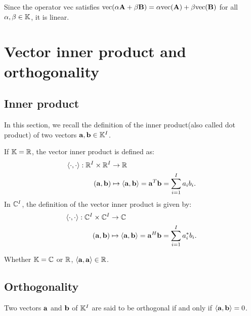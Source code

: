 \begin{remark}
    Since the operator $\text{vec}$ satisfies $\text{vec}(\alpha \bold{A}+\beta \bold{B})=\alpha \text{vec}(\bold{A})+\beta \text{vec}(\bold{B})$
    for all $\alpha,\beta\in\mathbb{K}$, it is linear.
\end{remark}


\section{Vector inner product and orthogonality}
\subsection{Inner product}

In this section, we recall the definition of the inner product(also called dot product)
of two vectors $\bold{a},\bold{b}\in\mathbb{K}^{I}$.
\begin{definition}{}{}
    If $\mathbb{K}=\mathbb{R}$, the vector inner product is defined as:
    \begin{align*}
        \langle\cdot,\cdot\rangle:\mathbb{R}^I\times \mathbb{R}^I&\rightarrow \mathbb{R}\\
        (\bold{a},\bold{b})&\mapsto \langle\bold{a},\bold{b}\rangle = \bold{a}^T\bold{b}=\sum\limits_{i=1}^{I}a_ib_i.
    \end{align*}
    In $\mathbb{C}^I$, the definition of the vector inner product is given by:
    \begin{align*}
        \langle\cdot,\cdot\rangle:\mathbb{C}^I\times \mathbb{C}^I&\rightarrow \mathbb{C}\\
        (\bold{a},\bold{b})&\mapsto \langle\bold{a},\bold{b}\rangle = \bold{a}^H\bold{b}=\sum\limits_{i=1}^{I}a_i^*b_i.
    \end{align*}
\end{definition}
\begin{remark}
    Whether $\mathbb{K}=\mathbb{C}$ or $\mathbb{R}$, $\langle\bold{a},\bold{a}\rangle\in \mathbb{R}$. 
\end{remark}


\subsection{Orthogonality}
\begin{definition}{}{}
    Two vectors $\bold{a}$ and $\bold{b}$ of $\mathbb{K}^{I}$ are said to be 
    orthogonal if and only if $\langle\bold{a},\bold{b}\rangle=0$. 
\end{definition}


